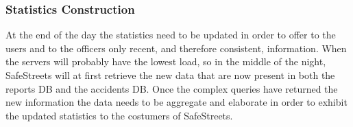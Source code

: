 \subsubsection{Statistics Construction}
At the end of the day the statistics need to be updated in order to offer to the users and to the officers only recent, and therefore consistent, information.
When the servers will probably have the lowest load, so in the middle of the night, SafeStreets will at first retrieve the new data that are now present in both the reports DB and the accidents DB. Once the complex queries have returned the new information the data needs to be aggregate and elaborate in order to exhibit the updated statistics to the costumers of SafeStreets. 
\\
\\
\\
\\
\\
\clearpage
